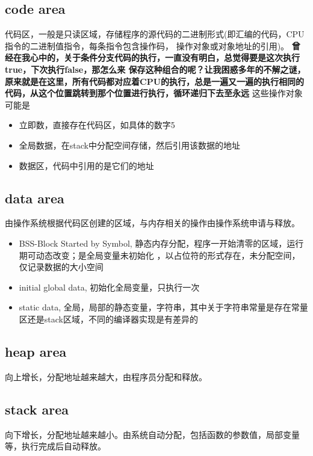 \subsection{code area}
代码区，一般是只读区域，存储程序的源代码的二进制形式(即汇编的代码，CPU指令的二进制值指令，每条指令包含操作码，
操作对象或对象地址的引用)。
\newline
\textbf{曾经在我心中的，关于条件分支代码的执行，一直没有明白，总觉得要是这次执行true，下次执行false，那怎么来
保存这种组合的呢？让我困惑多年的不解之谜，原来就是在这里，所有代码都对应着CPU的执行，总是一遍又一遍的执行相同的
代码，从这个位置跳转到那个位置进行执行，循环递归下去至永远}
\newline
这些操作对象可能是
\begin{itemize}
    \item {立即数，直接存在代码区，如具体的数字5}
    \item {全局数据，在stack中分配空间存储，然后引用该数据的地址}
    \item {数据区，代码中引用的是它们的地址}
\end{itemize}

\subsection{data area}
由操作系统根据代码区创建的区域，与内存相关的操作由操作系统申请与释放。
\begin{itemize}
    \item {BSS-Block Started by Symbol, 静态内存分配，程序一开始清零的区域，运行期可动态改变；是全局变量未初始化
    ，以占位符的形式存在，未分配空间，仅记录数据的大小空间
    }
    \item {initial global data, 初始化全局变量，只执行一次}
    \item {static data, 全局，局部的静态变量，字符串，其中关于字符串常量是存在常量区还是stack区域，不同的编译器实现是有差异的}
\end{itemize}

\subsection{heap area}
向上增长，分配地址越来越大，由程序员分配和释放。

\subsection{stack area}
向下增长，分配地址越来越小。由系统自动分配，包括函数的参数值，局部变量等，执行完成后自动释放。

